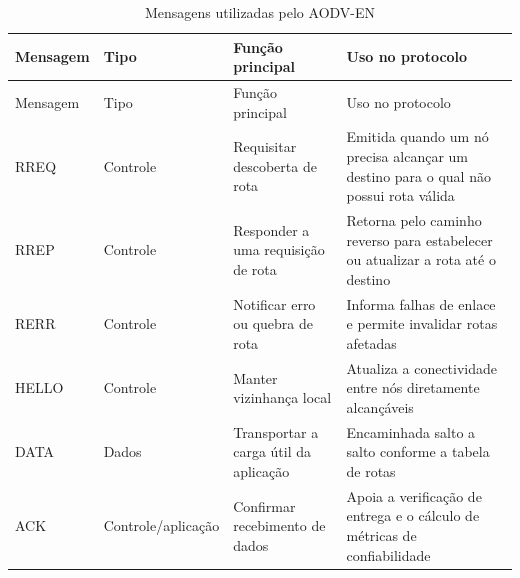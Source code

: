 {\def\LTcaptype{quadro}
\begin{longtable}[]{@{}
  >{\raggedright\arraybackslash}p{}
  >{\raggedright\arraybackslash}p{}
  >{\raggedright\arraybackslash}p{}
  >{\raggedright\arraybackslash}p{}@{}}
\caption{Mensagens utilizadas pelo AODV-EN}\label{quadro:mensagens}\\
\toprule\noalign{}
\begin{minipage}[b]{\linewidth}\raggedright
Mensagem
\end{minipage} & \begin{minipage}[b]{\linewidth}\raggedright
Tipo
\end{minipage} & \begin{minipage}[b]{\linewidth}\raggedright
Função principal
\end{minipage} & \begin{minipage}[b]{\linewidth}\raggedright
Uso no protocolo
\end{minipage} \\
\midrule\noalign{}
\endfirsthead
\toprule\noalign{}
\begin{minipage}[b]{\linewidth}\raggedright
Mensagem
\end{minipage} & \begin{minipage}[b]{\linewidth}\raggedright
Tipo
\end{minipage} & \begin{minipage}[b]{\linewidth}\raggedright
Função principal
\end{minipage} & \begin{minipage}[b]{\linewidth}\raggedright
Uso no protocolo
\end{minipage} \\
\midrule\noalign{}
\endhead
\bottomrule\noalign{}
\endlastfoot
RREQ & Controle & Requisitar descoberta de rota & Emitida quando um nó
precisa alcançar um destino para o qual não possui rota válida \\
RREP & Controle & Responder a uma requisição de rota & Retorna pelo
caminho reverso para estabelecer ou atualizar a rota até o destino \\
RERR & Controle & Notificar erro ou quebra de rota & Informa falhas de
enlace e permite invalidar rotas afetadas \\
HELLO & Controle & Manter vizinhança local & Atualiza a conectividade
entre nós diretamente alcançáveis \\
DATA & Dados & Transportar a carga útil da aplicação & Encaminhada salto
a salto conforme a tabela de rotas \\
ACK & Controle/aplicação & Confirmar recebimento de dados & Apoia a
verificação de entrega e o cálculo de métricas de confiabilidade \\
\end{longtable}
}

